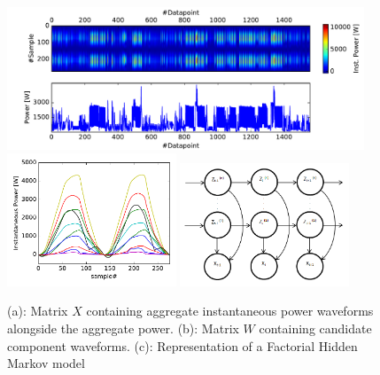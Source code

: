 \begin{figure}[h]
\centering
\includegraphics[width=0.95\textwidth]{varbolt/matrixX_rev.pdf}\\
\includegraphics[width=0.45\textwidth]{varbolt/matrixW.pdf}
\includegraphics[width=0.45\textwidth]{varbolt/FHMM.png}
  \caption[VarBOLT: Aggregate instantaneous power waveforms and extracted candidate waveforms.]{(a): Matrix $X$ containing aggregate instantaneous power waveforms alongside the aggregate power. (b): Matrix $W$ containing candidate component waveforms. (c): Representation of a Factorial Hidden Markov model}
\end{figure}

